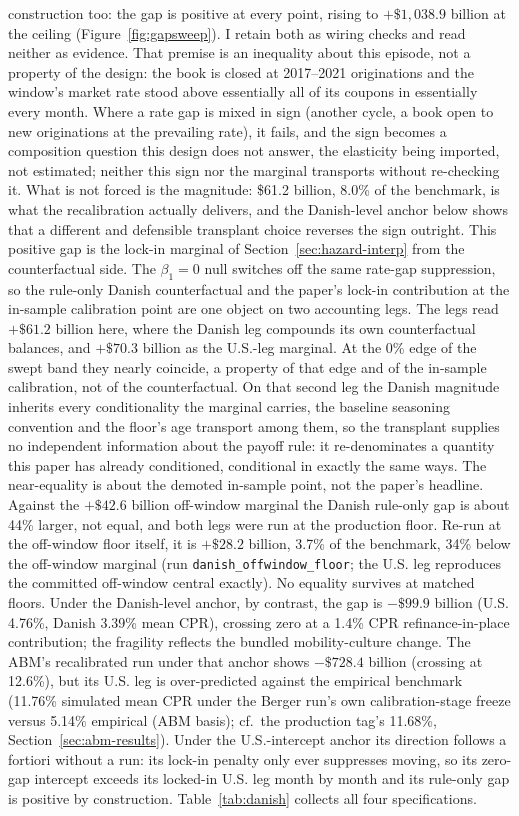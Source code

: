 \documentclass[12pt]{article}
\begin{document}
construction too: the gap is positive at every point, rising to $+\$1{,}038.9$ billion at the ceiling (Figure~\ref{fig:gapsweep}). I retain both as wiring checks and read neither as evidence. That premise is an inequality about this episode, not a property of the design: the book is closed at 2017--2021 originations and the window's market rate stood above essentially all of its coupons in essentially every month. Where a rate gap is mixed in sign (another cycle, a book open to new originations at the prevailing rate), it fails, and the sign becomes a composition question this design does not answer, the elasticity being imported, not estimated; neither this sign nor the marginal transports without re-checking it. What is not forced is the magnitude: \$61.2 billion, 8.0\% of the benchmark, is what the recalibration actually delivers, and the Danish-level anchor below shows that a different and defensible transplant choice reverses the sign outright. This positive gap is the lock-in marginal of Section~\ref{sec:hazard-interp} from the counterfactual side. The $\beta_1 = 0$ null switches off the same rate-gap suppression, so the rule-only Danish counterfactual and the paper's lock-in contribution at the in-sample calibration point are one object on two accounting legs. The legs read $+\$61.2$ billion here, where the Danish leg compounds its own counterfactual balances, and $+\$70.3$ billion as the U.S.-leg marginal. At the 0\% edge of the swept band they nearly coincide, a property of that edge and of the in-sample calibration, not of the counterfactual. On that second leg the Danish magnitude inherits every conditionality the marginal carries, the baseline seasoning convention and the floor's age transport among them, so the transplant supplies no independent information about the payoff rule: it re-denominates a quantity this paper has already conditioned, conditional in exactly the same ways. The near-equality is about the demoted in-sample point, not the paper's headline. Against the $+\$42.6$ billion off-window marginal the Danish rule-only gap is about 44\% larger, not equal, and both legs were run at the production floor. Re-run at the off-window floor itself, it is $+\$28.2$ billion, 3.7\% of the benchmark, 34\% below the off-window marginal (run \texttt{danish\_offwindow\_floor}; the U.S. leg reproduces the committed off-window central exactly). No equality survives at matched floors. Under the Danish-level anchor, by contrast, the gap is $-\$99.9$ billion (U.S. 4.76\%, Danish 3.39\% mean CPR), crossing zero at a 1.4\% CPR refinance-in-place contribution; the fragility reflects the bundled mobility-culture change. The ABM's recalibrated run under that anchor shows $-\$728.4$ billion (crossing at 12.6\%), but its U.S. leg is over-predicted against the empirical benchmark (11.76\% simulated mean CPR under the Berger run's own calibration-stage freeze versus 5.14\% empirical (ABM basis); cf.\ the production tag's 11.68\%, Section~\ref{sec:abm-results}). Under the U.S.-intercept anchor its direction follows a fortiori without a run: its lock-in penalty only ever suppresses moving, so its zero-gap intercept exceeds its locked-in U.S. leg month by month and its rule-only gap is positive by construction. Table~\ref{tab:danish} collects all four specifications.
\end{document}
